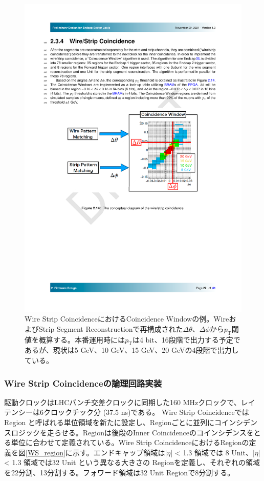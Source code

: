 \begin{figure} 
\centering
\includegraphics[width=16cm]{fig/SL/Concept_WS.pdf}
\caption[Wire Strip CoincidenceにおけるCoincidence Windowの例]{Wire Strip CoincidenceにおけるCoincidence Windowの例\cite{SLPDR}。WireおよびStrip Segment Reconstructionで再構成された$\Delta\theta$、$\Delta\phi$から$p_\mathrm{T}$閾値を概算する。本番運用時には$p_\mathrm{T}$は4 bit、16段階で出力する予定であるが、現状は5 GeV、10 GeV、15 GeV、20 GeVの4段階で出力している。}
\label{Concept_WS}
\end{figure}

\subsubsection*{Wire Strip Coincidenceの論理回路実装}
駆動クロックはLHCバンチ交差クロックに同期した160 MHzクロックで、レイテンシーは6クロックチック分 (37.5 ns)である。
Wire Strip Coincidenceでは Region と呼ばれる単位領域を新たに設定し、Regionごとに並列にコインシデンスロジックを走らせる。Regionは後段のInner Coincidenceのコインシデンスをとる単位に合わせて定義されている。Wire Strip CoincidenceにおけるRegionの定義を図\ref{WS_region}に示す。エンドキャップ領域は|$\eta$| < 1.3 領域では 8 Unit、|$\eta$| < 1.3 領域では32 Unit という異なる大きさの Regionを定義し、それぞれの領域を22分割、13分割する。フォワード領域は32 Unit Regionで8分割する。

